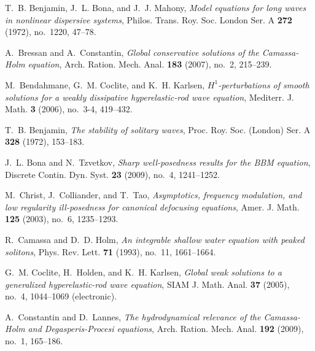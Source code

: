 \documentclass[12pt,reqno]{amsbook}
\numberwithin{section}{chapter}
\numberwithin{equation}{section}  %
\theoremstyle{remark}
\begin{document}

%
\providecommand{\bysame}{\leavevmode\hbox to3em{\hrulefill}\thinspace}
\providecommand{\MR}{\relax\ifhmode\unskip\space\fi MR }
\providecommand{\MRhref}[2]{%
  \href{http://www.ams.org/mathscinet-getitem?mr=#1}{#2}
}
\providecommand{\href}[2]{#2}
\begin{thebibliography}{HIKK10}

T.~B. Benjamin, J.~L. Bona, and J.~J. Mahony, \emph{{Model equations for long
  waves in nonlinear dispersive systems}}, Philos. Trans. Roy. Soc. London Ser.
  A \textbf{272} (1972), no.~1220, 47--78.

A.~Bressan and A.~Constantin, \emph{{Global conservative solutions of the
  Camassa-Holm equation}}, Arch. Ration. Mech. Anal. \textbf{183} (2007),
  no.~2, 215--239.

M.~Bendahmane, G.~M. Coclite, and K.~H. Karlsen,
  \emph{$H^1$-perturbations of smooth solutions for a weakly dissipative
  hyperelastic-rod wave equation}, Mediterr. J. Math. \textbf{3} (2006),
  no.~3-4, 419--432.

T.~B. Benjamin, \emph{{The stability of solitary waves}}, Proc. Roy. Soc.
  (London) Ser. A \textbf{328} (1972), 153--183.

J.~L. Bona and N.~Tzvetkov, \emph{{Sharp well-posedness results for the BBM
  equation}}, Discrete Contin. Dyn. Syst. \textbf{23} (2009), no.~4,
  1241--1252.

M.~Christ, J.~Colliander, and T.~Tao, \emph{{Asymptotics, frequency modulation,
  and low regularity ill-posedness for canonical defocusing equations}}, Amer.
  J. Math. \textbf{125} (2003), no.~6, 1235--1293.

R.~Camassa and D.~D. Holm, \emph{{An integrable shallow water equation with
  peaked solitons}}, Phys. Rev. Lett. \textbf{71} (1993), no.~11, 1661--1664.

G.~M. Coclite, H.~Holden, and K.~H. Karlsen, \emph{{Global weak solutions to a
  generalized hyperelastic-rod wave equation}}, SIAM J. Math. Anal. \textbf{37}
  (2005), no.~4, 1044--1069 (electronic).

A.~Constantin and D.~Lannes, \emph{{The hydrodynamical relevance of the
  Camassa-Holm and Degasperis-Procesi equations}}, Arch. Ration. Mech. Anal.
  \textbf{192} (2009), no.~1, 165--186.


\end{thebibliography}
\end{document}
